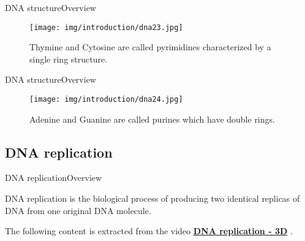 \documentclass[10pt]{beamer}
\newcommand{\1}{
	\setbeamertemplate{background}{
		\texttt{[image: img/1]}
		\tikz[overlay] \fill[fill opacity=0.75,fill=white] (0,0) rectangle (-\paperwidth,\paperheight);
	}
}
\begin{document}
\begin{frame}{DNA structure}{Overview}
	\begin{figure}[]
		\centering
		\texttt{[image: img/introduction/dna23.jpg]}
		\label{img:mot2}
		\caption{Thymine and Cytosine are called pyrimidines characterized by a single ring structure.}
	\end{figure}
\end{frame}

\begin{frame}{DNA structure}{Overview}
	\begin{figure}[]
		\centering
		\texttt{[image: img/introduction/dna24.jpg]}
		\label{img:mot2}
		\caption{Adenine and Guanine are called purines which have double rings.}
	\end{figure}
\end{frame}


\subsection{DNA replication}

\begin{frame}{DNA replication}{Overview}
\begin{block}{}
	DNA replication is the biological process of producing two identical replicas of DNA from one original DNA molecule.
\end{block}

\begin{block}{}
	The following content is extracted from the video \href{https://www.youtube.com/watch?v=TNKWgcFPHqw}{\textbf{DNA replication - 3D}} \cite{MITx2020}.
\end{block}
\end{frame}
\end{document}
